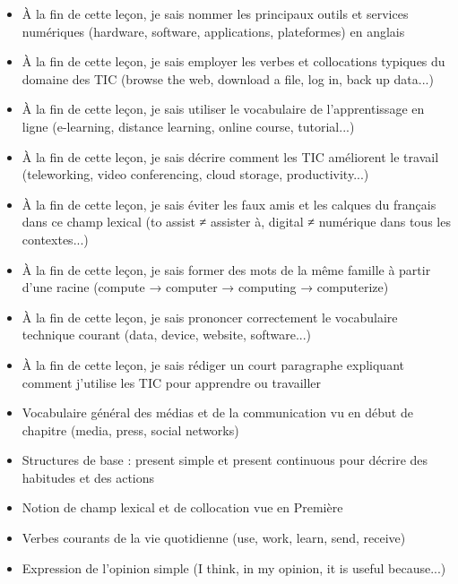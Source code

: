 \documentclass[11pt]{article}
\begin{document}
\begin{objectifs}
\begin{itemize}
\item À la fin de cette leçon, je sais nommer les principaux outils et services numériques (hardware, software, applications, plateformes) en anglais
\item À la fin de cette leçon, je sais employer les verbes et collocations typiques du domaine des TIC (browse the web, download a file, log in, back up data...)
\item À la fin de cette leçon, je sais utiliser le vocabulaire de l'apprentissage en ligne (e-learning, distance learning, online course, tutorial...)
\item À la fin de cette leçon, je sais décrire comment les TIC améliorent le travail (teleworking, video conferencing, cloud storage, productivity...)
\item À la fin de cette leçon, je sais éviter les faux amis et les calques du français dans ce champ lexical (to assist ≠ assister à, digital ≠ numérique dans tous les contextes...)
\item À la fin de cette leçon, je sais former des mots de la même famille à partir d'une racine (compute → computer → computing → computerize)
\item À la fin de cette leçon, je sais prononcer correctement le vocabulaire technique courant (data, device, website, software...)
\item À la fin de cette leçon, je sais rédiger un court paragraphe expliquant comment j'utilise les TIC pour apprendre ou travailler
\end{itemize}
\end{objectifs}

\begin{prerequis}
\begin{itemize}
\item Vocabulaire général des médias et de la communication vu en début de chapitre (media, press, social networks)
\item Structures de base : present simple et present continuous pour décrire des habitudes et des actions
\item Notion de champ lexical et de collocation vue en Première
\item Verbes courants de la vie quotidienne (use, work, learn, send, receive)
\item Expression de l'opinion simple (I think, in my opinion, it is useful because...)
\end{itemize}
\end{prerequis}
\end{document}
